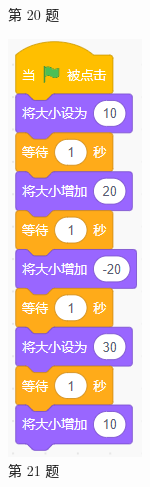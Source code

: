 \documentclass[10pt, a4paper]{article}
\begin{document}
\begin{enumerate}
\begin{figure}[htbp]
\begin{minipage}[t]{.22\textwidth}
                \caption*{第 20 题}
            \end{minipage}
            \begin{minipage}[t]{.09\textwidth}
                \centering
                \includegraphics[width=\textwidth]{21.png}
                \caption*{第 21 题}
            \end{minipage}
        \end{figure}


\end{enumerate}
\end{document}

